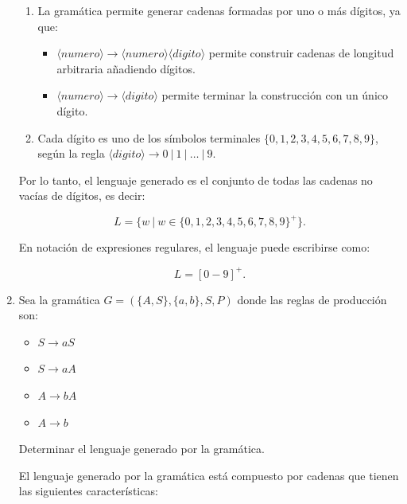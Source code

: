 \documentclass[12pt]{book} %
\begin{document}
\begin{enumerate}
\begin{solucion}[Ejercicio 2.b]
   \begin{enumerate}
       \item La gramática permite generar cadenas formadas por uno o más dígitos, ya que:
           \begin{itemize}
               \item $\langle numero \rangle \to \langle numero \rangle \langle digito \rangle$ permite construir cadenas de longitud arbitraria añadiendo dígitos.
               \item $\langle numero \rangle \to \langle digito \rangle$ permite terminar la construcción con un único dígito.
           \end{itemize}
       \item Cada dígito es uno de los símbolos terminales $\{0, 1, 2, 3, 4, 5, 6, 7, 8, 9\}$, según la regla $\langle digito \rangle \to 0 \ | \ 1 \ | \ \dots \ | \ 9$.
   \end{enumerate}

   Por lo tanto, el lenguaje generado es el conjunto de todas las cadenas no vacías de dígitos, es decir:

   $$
   L = \{ w \ | \ w \in \{0, 1, 2, 3, 4, 5, 6, 7, 8, 9\}^+ \}.
   $$

   En notación de expresiones regulares, el lenguaje puede escribirse como:

   $$
   L = [0-9]^+.
   $$

   \end{solucion}
\item
  Sea la gramática \(G = (\{A, S\}, \{a, b\}, S, P)\) donde las reglas
  de producción son:\\

  \begin{itemize}
       \item $S \to aS$
       \item $S \to aA$
       \item $A \to bA$
       \item $A \to b$
   \end{itemize}

  Determinar el lenguaje generado por la gramática.

  \begin{solucion}[Ejercicio 2.c]

   El lenguaje generado por la gramática está compuesto por cadenas que tienen las siguientes características:


\end{solucion}
\end{enumerate}
\end{document}
